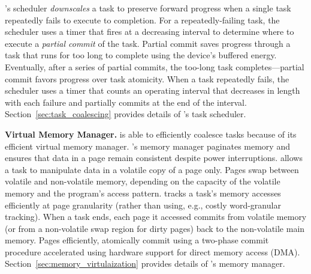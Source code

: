 \sys's scheduler {\em downscales} a task to preserve forward progress when a
single task repeatedly fails to execute to completion.  For a repeatedly-failing
task, the scheduler uses a timer that fires at a decreasing interval to
determine where to execute a {\em partial commit} of the task. Partial
commit saves progress through a task that runs for too long to complete
using the device's buffered energy. Eventually, after a series of partial
commits, the too-long task completes---partial commit favors progress over task atomicity.  
When a task repeatedly fails, the scheduler uses a timer that counts an operating interval
that decreases in length with each failure and \sys partially commits at the end of the interval. 
Section~\ref{sec:task_coalescing} provides details of \sys's task scheduler.

\textbf{Virtual Memory Manager.} \sys is able to efficiently coalesce
tasks because of its efficient virtual memory manager. \sys's memory manager
paginates memory and ensures that data in a page remain consistent despite
power interruptions. \sys allows a task to manipulate data in a volatile copy
of a page only. Pages swap between volatile and non-volatile memory, depending
on the capacity of the volatile memory and the program's access pattern. \sys
tracks a task's memory accesses efficiently at page granularity (rather than
using, e.g., costly word-granular tracking). When a task ends, each page it
accessed commits from volatile memory (or from a non-volatile swap region for
dirty pages) back to the non-volatile main memory. Pages efficiently,
atomically commit using a two-phase commit procedure accelerated using hardware
support for direct memory access (DMA). Section~\ref{sec:memory_virtulaization}
provides details of \sys's memory manager.
